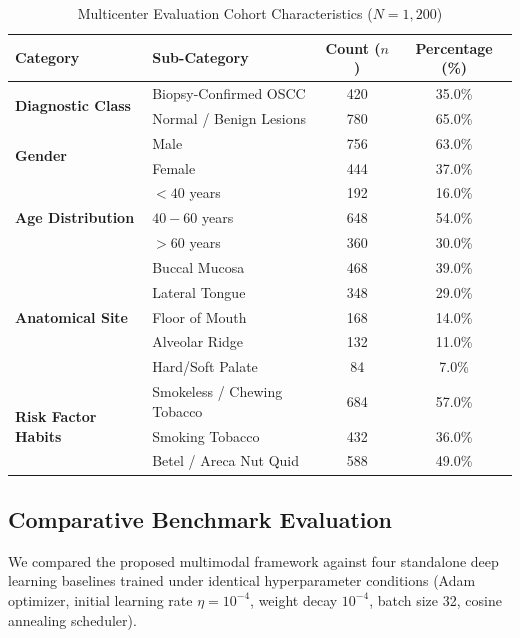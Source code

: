 \documentclass[journal]{IEEEtran}
\begin{document}
\begin{table}[t]
\centering
\caption{Multicenter Evaluation Cohort Characteristics ($N=1{,}200$)}
\label{tab:demographics}
\renewcommand{\arraystretch}{1.1}
\begin{tabular}{llcc}
\hline
\textbf{Category} & \textbf{Sub-Category} & \textbf{Count ($n$)} & \textbf{Percentage (\%)} \\
\hline
\multirow{2}{*}{\textbf{Diagnostic Class}} & Biopsy-Confirmed OSCC & 420 & 35.0\% \\
 & Normal / Benign Lesions & 780 & 65.0\% \\
\hline
\multirow{2}{*}{\textbf{Gender}} & Male & 756 & 63.0\% \\
 & Female & 444 & 37.0\% \\
\hline
\multirow{3}{*}{\textbf{Age Distribution}} & $< 40$ years & 192 & 16.0\% \\
 & $40 - 60$ years & 648 & 54.0\% \\
 & $> 60$ years & 360 & 30.0\% \\
\hline
\multirow{5}{*}{\textbf{Anatomical Site}} & Buccal Mucosa & 468 & 39.0\% \\
 & Lateral Tongue & 348 & 29.0\% \\
 & Floor of Mouth & 168 & 14.0\% \\
 & Alveolar Ridge & 132 & 11.0\% \\
 & Hard/Soft Palate & 84 & 7.0\% \\
\hline
\multirow{3}{*}{\textbf{Risk Factor Habits}} & Smokeless / Chewing Tobacco & 684 & 57.0\% \\
 & Smoking Tobacco & 432 & 36.0\% \\
 & Betel / Areca Nut Quid & 588 & 49.0\% \\
\hline
\end{tabular}
\end{table}

\subsection{Comparative Benchmark Evaluation}
We compared the proposed multimodal framework against four standalone deep learning baselines trained under identical hyperparameter conditions (Adam optimizer, initial learning rate $\eta = 10^{-4}$, weight decay $10^{-4}$, batch size 32, cosine annealing scheduler).
\end{document}
